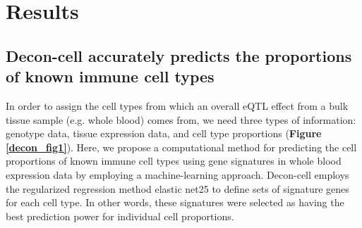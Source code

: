 \section{Results}
\subsection{Decon-cell accurately predicts the proportions of known immune cell types}
In order to assign the cell types from which an overall eQTL effect from a bulk tissue sample (e.g. whole blood) comes from, we need three types of information: genotype data, tissue expression data, and cell type proportions (\textbf{Figure \ref{decon_fig1}}). Here, we propose a computational method for predicting the cell proportions of known immune cell types using gene signatures in whole blood expression data by employing a machine-learning approach. Decon-cell employs the regularized regression method elastic net25 to define sets of signature genes for each cell type. In other words, these signatures were selected as having the best prediction power for individual cell proportions. 

